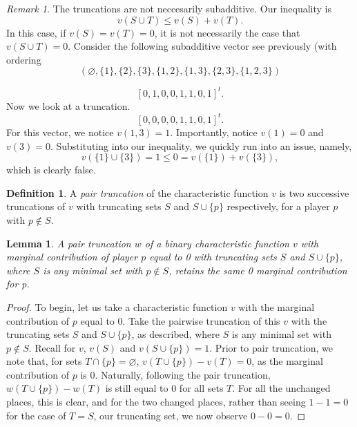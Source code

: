\documentclass[12pt,letterpaper,final]{article}
\theoremstyle{plain}
\theoremstyle{plain}
\theoremstyle{plain}
\newtheorem{lemma}[theorem]{Lemma}
\theoremstyle{plain}
\theoremstyle{plain}
\theoremstyle{plain}
\theoremstyle{plain}
\theoremstyle{definition}
\newtheorem{definition}{Definition}[section]
\theoremstyle{definition}
\theoremstyle{definition}
\theoremstyle{definition}
\theoremstyle{definition}
\theoremstyle{remark}
\newtheorem*{remark}{Remark}
\theoremstyle{remark}
\theoremstyle{remark}
\theoremstyle{remark}
\begin{document}
\begin{remark}
  The truncations are not neccesarily subadditive. 
  Our inequality is
  \[
    v(S\cup T) \leq v(S) +v(T).
  \]
  In this case, if \(v(S) = v(T)=0\), it is not necessarily the case
  that \(v(S\cup T) = 0\). Consider the following subadditive vector
  see previously (with ordering
  \[
    {\left(
        \varnothing, \{1\}, \{2\},\{3\}, \{1,2\}, \{1,3\}, \{2,3\}, \{1,2,3\}
      \right)}
  \]
      
  \[
    {\left[
      0 , 1, 0, 0, 1, 1, 0, 1
    \right]}^t.
  \]
  Now we look at a truncation.
  \[
    {\left[
        0 , 0, 0, 0, 1, 1, 0, 1
    \right]}^t.
  \]
  For this vector, we notice \(v(1,3) = 1\). Importantly, notice
  \(v(1) = 0\) and \(v(3) = 0\). Substituting into our inequality, we
  quickly run into an issue, namely,
  \[
    v(\{1\} \cup \{3\}) = 1 \leq  0 = v(\{1\}) + v(\{3\}),
  \]
  which is clearly false.
\end{remark}

\begin{definition}
  A \emph{pair truncation} of the characteristic function \(v\) is two successive
  truncations of \(v\) with truncating sets \(S\) and \(S\cup\{p\}\)
  respectively, for a player \(p\) with \(p\notin S\).
\end{definition}

\begin{lemma}\label{lem:truncFunc}
  A pair truncation \(w\) of a binary characteristic function \(v\) with marginal
  contribution of player \(p\) equal to 0 with truncating sets \(S\)
  and \(S\cup\{p\}\), where \(S\) is any minimal set with
  \(p\notin S\), retains the same 0 marginal contribution for p.
\end{lemma}

\begin{proof}
  To begin, let us take a characteristic function \(v\) with the marginal
  contribution of \(p\) equal to 0. Take the pairwise truncation of
  this \(v\) with the truncating sets \(S\) and \(S\cup\{p\}\), as
  described, where \(S\) is any minimal set with \(p\notin S\).
  Recall for \(v\), \(v(S)\) and \(v(S\cup \{p\})=1\).  Prior to pair
  truncation, we note that, for sets \(T \cap \{p\} =\varnothing\),
  \(v(T \cup \{p\}) - v(T) = 0\), as the marginal contribution of
  \(p\) is 0.  Naturally, following the pair truncation,
  \(w(T \cup \{p\}) - w(T)\) is still equal to \(0\) for all sets
  \(T\).  For all the unchanged places, this is clear, and for the two
  changed places, rather than seeing \(1-1=0\) for the case of
  \(T = S\), our truncating set, we now observe \(0-0=0\).
\end{proof}
\end{document}
